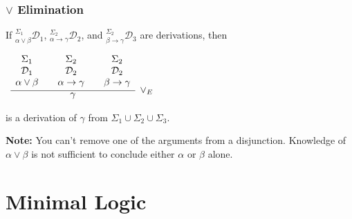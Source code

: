 \documentclass{beamer}
\theoremstyle{indentDefn} \newtheorem{defn}[]{Definition}
\begin{document}
\begin{frame}
	\frametitle{$\lor$ Elimination}
	
	If $^{\Sigma_{1}}_{\alpha\lor\beta}\mathcal{D}_{1}$, $^{\Sigma_{2}}_{\alpha\rightarrow\gamma}\mathcal{D}_{2}$, and $^{\Sigma_{2}}_{\beta\rightarrow\gamma}\mathcal{D}_{3}$ are derivations, then
	
	\begin{center}
	$\begin{array}{ c }
	
		\infer[\lor_{E}]{\gamma}
			{
			\begin{array}{c} \Sigma_{1}  \\ \mathcal{D}_{1} \\ \alpha\lor\beta \end{array}
			 & 
			\begin{array}{c} \Sigma_{2}  \\ \mathcal{D}_{2} \\ \alpha\rightarrow\gamma \end{array}				
			 & 
			\begin{array}{c} \Sigma_{2}  \\ \mathcal{D}_{2} \\ \beta\rightarrow\gamma \end{array}				 
			}	
	
	\end{array}$
	\end{center}
	
	is a derivation of $\gamma$ from $\Sigma_{1}\cup\Sigma_{2}\cup\Sigma_{3}$.
	
	\vspace{1cm}
	
	{\bf Note:} You can't remove one of the arguments from a disjunction. Knowledge of $\alpha \lor \beta$ is not sufficient to conclude either $\alpha$ or $\beta$ alone.
	
\end{frame}

\section{Minimal Logic}
\end{document}
